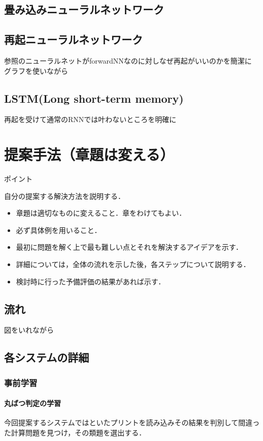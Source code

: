 \documentclass[a4j,11pt,report]{jsbook}
\newcommand{\point}[1]{
\begin{itembox}[l]{ポイント}
  #1
\end{itembox}
}
\begin{document}
\section{畳み込みニューラルネットワーク}


\section{再起ニューラルネットワーク}

参照のニューラルネットがforwardNNなのに対しなぜ再起がいいのかを簡潔に
グラフを使いながら

\section{LSTM(Long short-term memory)}

再起を受けて通常のRNNでは叶わないところを明確に





\chapter{提案手法（章題は変える）\label{ch:method}}
\point{
自分の提案する解決方法を説明する．
\begin{itemize}
  \item 章題は適切なものに変えること．章をわけてもよい．
  \item 必ず具体例を用いること．
  \item 最初に問題を解く上で最も難しい点とそれを解決するアイデアを示す．
  \item 詳細については，全体の流れを示した後，各ステップについて説明する．
  \item 検討時に行った予備評価の結果があれば示す．
\end{itemize}
}

\section{流れ}
図をいれながら
\section{各システムの詳細}
\subsection{事前学習}

\subsubsection{丸ばつ判定の学習}
今回提案するシステムではといたプリントを読み込みその結果を判別して間違った計算問題を見つけ，その類題を選出する．
\end{document}
